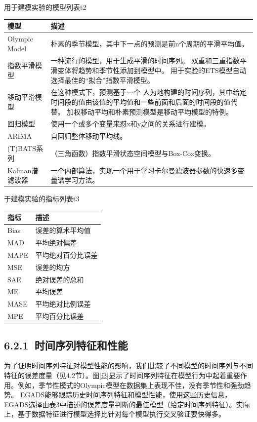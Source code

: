 \documentclass[a4paper,AutoFakeBold,oneside,12pt]{book}
\begin{document}
\begin{bupttable}{用于建模实验的模型列表}{t2}
    \begin{tabular}{l|l}
		\hline \textbf{模型} & \textbf{描述} \\
		\hline Olympic Model & 朴素的季节模型，其中下一点的预测是前n个周期的平滑平均值。 \\
		\hline 指数平滑模型 & 一种流行的模型，用于生成平滑的时间序列。 双重和三重指数平滑变体将趋势和季节性添加到模型中。 用于实验的ETS模型自动选择最佳的“拟合”指数平滑模型。  \\
		\hline 移动平滑模型 & 在这种模式下，预测基于一个
人为地构建的时间序列，其中给定时间段的值由该值的平均值和一些前面和后面的时间段的值代替。 加权移动平均和朴素预测模型是移动平均模型的特例。  \\
		\hline 回归模型 & 使用一个或多个变量来怼x和y之间的关系进行建模。\\
		\hline ARIMA & 自回归整体移动平均线。  \\
		\hline (T)BATS系列 & （三角函数）指数平滑状态空间模型与Box-Cox变换。  \\
		\hline Kalman谱滤波器 & 一个内部算法，实现一个用于学习卡尔曼滤波器参数的快速多变量谱学习方法。  \\
		\hline
    \end{tabular}
\end{bupttable}

\begin{bupttable}{于建模实验的指标列表}{t3}
    \begin{tabular}{l|l}
		\hline \textbf{指标} & \textbf{描述} \\
		\hline Bias & 误差的算术平均值 \\
		\hline MAD & 平均绝对偏差  \\
		\hline MAPE & 平均绝对百分比误差  \\
		\hline MSE & 误差的均方\\
		\hline SAE & 绝对误差的总和  \\
		\hline ME & 平均误差  \\
		\hline MASE & 平均绝对比例误差  \\
		\hline MPE & 平均百分比误差  \\
		\hline
    \end{tabular}
\end{bupttable}

\subsection*{6.2.1\ 时间序列特征和性能}
为了证明时间序列特征对模型性能的影响，我们比较了不同模型的时间序列与不同特征的误差度量（见4.2节）。图\ref{f3}显示了时间序列特征在模型行为中起着重要作用。例如，季节性模式的Olympic模型在数据集上表现不佳，没有季节性和强劲趋势。 EGADS能够跟踪历史时间序列特征和模型性能，使用这些历史信息，EGADS选择由表3中描述的误差度量判断的最佳模型（给定时间序列特征）。实际上，基于数据特征进行模型选择比针对每个模型执行交叉验证要快得多。
\end{document}
